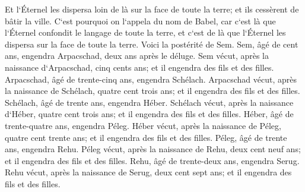\verse Et l`Éternel les dispersa loin de là sur la face de toute la terre; et ils cessèrent de bâtir la ville. 
\verse C`est pourquoi on l`appela du nom de Babel, car c`est là que l`Éternel confondit le langage de toute la terre, et c`est de là que l`Éternel les dispersa sur la face de toute la terre. 
\verse Voici la postérité de Sem. Sem, âgé de cent ans, engendra Arpacschad, deux ans après le déluge. 
\verse Sem vécut, après la naissance d`Arpacschad, cinq cents ans; et il engendra des fils et des filles. 
\verse Arpacschad, âgé de trente-cinq ans, engendra Schélach. 
\verse Arpacschad vécut, après la naissance de Schélach, quatre cent trois ans; et il engendra des fils et des filles. 
\verse Schélach, âgé de trente ans, engendra Héber. 
\verse Schélach vécut, après la naissance d`Héber, quatre cent trois ans; et il engendra des fils et des filles. 
\verse Héber, âgé de trente-quatre ans, engendra Péleg. 
\verse Héber vécut, après la naissance de Péleg, quatre cent trente ans; et il engendra des fils et des filles. 
\verse Péleg, âgé de trente ans, engendra Rehu. 
\verse Péleg vécut, après la naissance de Rehu, deux cent neuf ans; et il engendra des fils et des filles. 
\verse Rehu, âgé de trente-deux ans, engendra Serug. 
\verse Rehu vécut, après la naissance de Serug, deux cent sept ans; et il engendra des fils et des filles. 
